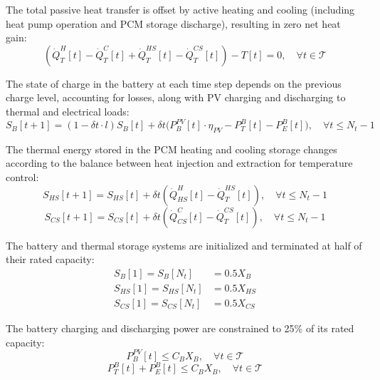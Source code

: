\documentclass[11pt]{article}
\begin{document}
The total passive heat transfer is offset by active heating and cooling (including heat pump operation and PCM storage discharge), resulting in zero net heat gain:
\begin{equation}
(\dot{Q}^H_T[t] - \dot{Q}^C_T[t] + \dot{Q}^{HS}_T[t] - \dot{Q}^{CS}_T[t]) - T[t] = 0 , \quad \forall t \in \mathcal{T} \label{eq:hvac_balance}
\end{equation}

The state of charge in the battery at each time step depends on the previous charge level, accounting for losses, along with PV charging and discharging to thermal and electrical loads:
\begin{equation}
    S_{B}[t+1] = (1 - \delta t \cdot l) S_{B}[t] + \delta t \bigl(P^{PV}_B[t] \cdot \eta_{PV} - P^{B}_T[t] - P^{B}_E[t]\bigr), \quad \forall t \leq N_t-1
    \label{eq:batt_dyn}
\end{equation}

The thermal energy stored in the PCM heating and cooling storage changes according to the balance between heat injection and extraction for temperature control:
\begin{equation}
S_{HS}[t+1] = S_{HS}[t] + \delta t (\dot{Q}^{H}_{HS}[t] - \dot{Q}^{HS}_T[t]), \quad \forall t \leq N_t-1
\label{eq:pcmh_dyn}
\end{equation}
\begin{equation}
S_{CS}[t+1] = S_{CS}[t] + \delta t (\dot{Q}^{C}_{CS}[t] - \dot{Q}^{CS}_T[t]), \quad \forall t \leq N_t-1
\label{eq:pcmc_dyn}
\end{equation}

The battery and thermal storage systems are initialized and terminated at half of their rated capacity:
\begin{align}
S_{B}[1] = S_{B}[N_t] &= 0.5 X_B \label{eq:batt_bc} \\
S_{HS}[1] = S_{HS}[N_t] &= 0.5 X_{HS} \label{eq:pcmh_bc} \\
S_{CS}[1] = S_{CS}[N_t] &= 0.5 X_{CS} \label{eq:pcmc_bc}
\end{align}

The battery charging and discharging power are constrained to 25\% of its rated capacity:
\begin{equation}
P^{PV}_B[t] \leq C_{B} X_B, \quad \forall t \in \mathcal{T}
\label{eq:b_charge_limit}
\end{equation}
\begin{equation}
P^B_T[t] + P^B_E[t] \leq C_{B} X_B, \quad \forall t \in \mathcal{T}
\label{eq:b_discharge_limit}
\end{equation}
\end{document}
